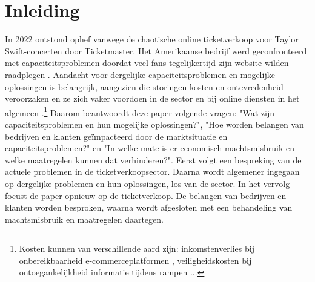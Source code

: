 
\section{Inleiding}

In 2022 ontstond ophef vanwege de chaotische online ticketverkoop voor 
Taylor Swift-concerten door Ticketmaster. Het Amerikaanse bedrijf werd
geconfronteerd met capaciteitsproblemen doordat veel fans tegelijkertijd
zijn website wilden raadplegen \cite{kelley2022senate,belga2022taylor}.
Aandacht voor dergelijke capaciteitsproblemen en mogelijke oplossingen
is belangrijk, aangezien die storingen kosten en ontevredenheid veroorzaken en
ze zich vaker voordoen in de sector \cite{sisario2023ticketmaster,
timsit2023its} en bij online diensten in het algemeen \cite{warren2023chatgpt, 
warren2020discord, reuters2023what}.\footnote{Kosten kunnen van verschillende
aard zijn: inkomstenverlies bij onbereikbaarheid e-commerceplatformen
\cite{guitart2007designing}, veiligheidskosten bij
ontoegankelijkheid informatie tijdens rampen
\cite{andersson2006design} ...}
Daarom beantwoordt deze paper volgende vragen:
"Wat zijn capaciteitsproblemen en hun mogelijke oplossingen?",
"Hoe worden belangen van bedrijven en klanten
geïmpacteerd door de marktsituatie en capaciteitsproblemen?" en
"In welke mate is er economisch machtsmisbruik en welke maatregelen kunnen
dat verhinderen?".
Eerst volgt een bespreking van de actuele problemen in de ticketverkoopsector.
Daarna wordt algemener ingegaan op dergelijke problemen en hun oplossingen,
los van de sector.
In het vervolg focust de paper opnieuw op de ticketverkoop.
De belangen van bedrijven en klanten worden besproken,
waarna wordt afgesloten met een behandeling van machtsmisbruik en
maatregelen daartegen.